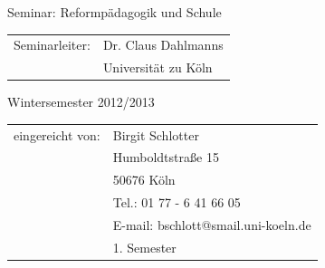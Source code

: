 \begin{titlepage}
\begin{center}

\begin{large}
Seminar: Reformpädagogik und Schule\\ [0.8em]
\end{large}


\begin{tabular}{rl}
        Seminarleiter:  &  Dr. Claus Dahlmanns\\
       			       &  \small Universität zu Köln \\[0.8em]
\end{tabular}
							  
\begin{large}
Wintersemester 2012/2013\\
\end{large}

\vspace{1.7cm}





\begin{tabular}{rl}
        eingereicht von:  &  Birgit Schlotter\\
       			       &  Humboldtstraße 15\\
			       &  50676 Köln\\
			&  Tel.: 01 77 - 6 41 66 05\\
			&  E-mail: bschlott@smail.uni-koeln.de\\
			&  1. Semester\\[0.8em]
\end{tabular}



%						
							
							
			
							
							
\end{center}

\end{titlepage}
